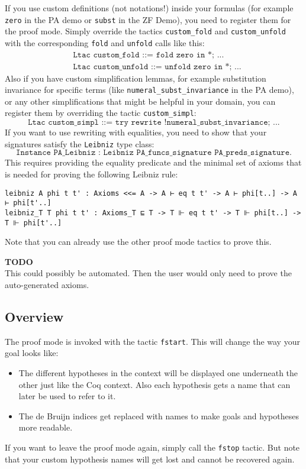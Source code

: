 \documentclass[12pt, a4paper]{article}
\newcommand{\coq}[1]{\texttt{#1}}
\newcommand{\improve}[1]{
	\vspace{3pt}
	\begin{boximprove}
		\parbox{\textwidth}{\textcolor{colorimprove}{\textbf{TODO}\\#1}}
	\end{boximprove}}
\begin{document}
\medskip\noindent
If you use custom definitions (not notations!) inside your formulas (for example \texttt{zero} in the PA demo or \texttt{subst} in the ZF Demo), you need to register them for the proof mode.
Simply override the tactics \texttt{custom\_fold} and \texttt{custom\_unfold} with the corresponding \texttt{fold} and \texttt{unfold} calls like this:
\begin{align*}
	& \coq{Ltac custom_fold ::= fold zero in *; ...} \\
	& \coq{Ltac custom_unfold ::= unfold zero in *; ...}
\end{align*}
Also if you have custom simplification lemmas, for example substitution invariance for specific terms (like \texttt{numeral\_subst\_invariance} in the PA demo), or any other simplifications that might be helpful in your domain, you can register them by overriding the tactic \texttt{custom\_simpl}:
$$\coq{Ltac custom_simpl ::= try rewrite !numeral_subst_invariance; ...}$$
If you want to use rewriting with equalities, you need to show that your signatures satisfy the \texttt{Leibniz} type class:
$$\coq{Instance PA_Leibniz : Leibniz PA_funcs_signature PA_preds_signature.}$$
This requires providing the equality predicate and the minimal set of axioms that is needed for proving the following Leibniz rule:

\begin{verbatim}
leibniz A phi t t' : Axioms <<= A -> A ⊢ eq t t' -> A ⊢ phi[t..] -> A ⊢ phi[t'..]
leibniz_T T phi t t' : Axioms_T ⊑ T -> T ⊩ eq t t' -> T ⊩ phi[t..] -> T ⊩ phi[t'..]
\end{verbatim}
Note that you can already use the other proof mode tactics to prove this.

\improve{This could possibly be automated. Then the user would only need to prove the auto-generated axioms.}


\subsection{Overview}

The proof mode is invoked with the tactic \texttt{fstart}. This will change the way your goal looks like:
\begin{itemize}
	\item 
	The different hypotheses in the context will be displayed one underneath the other just like the Coq context.
	Also each hypothesis gets a name that can later be used to refer to it.
	
	\item 
	The de Bruijn indices get replaced with names to make goals and hypotheses more readable.
\end{itemize}
If you want to leave the proof mode again, simply call the \texttt{fstop} tactic.
But note that your custom hypothesis names will get lost and cannot be recovered again.
\end{document}
